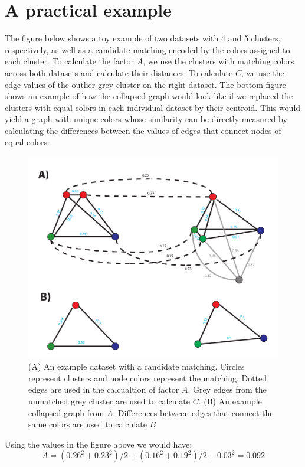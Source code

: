 \documentclass[11pt]{article}
\begin{document}
\section{A practical example}
The figure below shows a toy example of two datasets with 4 and 5 clusters, respectively, as well as a candidate matching encoded by the colors assigned to each cluster. To calculate the factor $A$, we use the clusters with matching colors across both datasets and calculate their distances. To calculate $C$, we use the edge values of the outlier grey cluster on the right dataset. The bottom figure shows an example of how the collapsed graph would look like if we replaced the clusters with equal colors in each individual dataset by their centroid. This would yield a graph with unique colors whose similarity can be directly measured by calculating the differences between the values of edges that connect nodes of equal colors. 
\begin{figure}[h]
\centering
\includegraphics[scale=0.55]{graph_matching}
\caption{(A) An example dataset with a candidate matching. Circles represent clusters and node colors represent the matching. Dotted edges are used in the calcualtion of factor $A$. Grey edges from the unmatched grey cluster are used to calculate $C$. (B) An example collapsed graph from $A$. Differences between edges that connect the same colors are used to calculate $B$}
\end{figure}
Using the values in the figure above we would have:
$$
A = (0.26^2+0.23^2)/2 +(0.16^2+0.19^2)/2 + 0.03^2 = 0.092
$$
\end{document}
